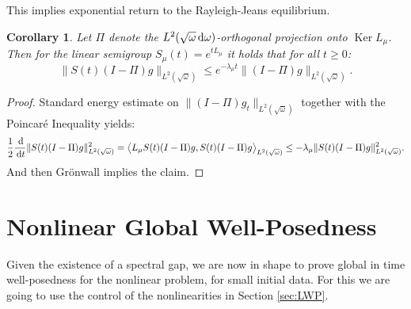 \documentclass[reqno,11pt,letterpaper]{amsart}
\numberwithin{equation}{section}
\newcommand{\dd}{\, {\rm d}}
\newtheorem{corollary}[proposition]{Corollary}
\begin{document}
This implies exponential return to the Rayleigh-Jeans equilibrium.  

\begin{corollary}
Let $\Pi$ denote the $L^2(\sqrt{\omega}\dd\omega)$-orthogonal projection onto $\operatorname{Ker}L_\mu$. Then for the linear semigroup  
$S_\mu(t) = e^{tL_\mu}$ it holds that for all $t \geq 0$:
$$
    \|S(t)(I-\Pi)g\|_{L^2(\sqrt{\omega})}
    \le
    e^{-\lambda_\mu t}\|(I-\Pi)g\|_{L^2(\sqrt{\omega})}.
$$
\end{corollary}
\begin{proof}
    Standard energy estimate on $\| (I-\Pi) g_t\|_{L^2(\sqrt{\omega})}$ together with the Poincaré Inequality yields: 
    $$
    \frac{1}{2}\frac{\dd}{\dd t}\|S(t)(I-\Pi)g\|_{L^2(\sqrt{\omega})}^2
    =
    \big\langle L_\mu S(t)(I-\Pi)g,S(t)(I-\Pi)g \big\rangle_{L^2(\sqrt{\omega})}\le
    -\lambda_\mu\|S(t)(I-\Pi)g\|_{L^2(\sqrt{\omega})}^2.
$$
And then Grönwall implies the claim. 
\end{proof}


\section{Nonlinear Global Well-Posedness} \label{sec:GWP}
Given the existence of a spectral gap, we are now in shape to prove global in time well-posedness for the nonlinear problem, for small initial data. For this we are going to use the control of the nonlinearities in Section \ref{sec:LWP}.
\end{document}
